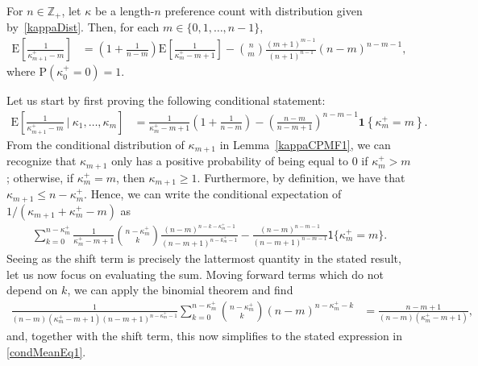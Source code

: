 \documentclass[opre,nonblindrev]{informs3_no_remark}
\newcommand{\E}[1]{{\mathrm{E}\left[#1\right]}}
\newcommand{\PP}[1]{\mathrm{P}\left( #1 \right)}
\begin{document}
\begin{lemma}\label{meanRecur1}
For $n \in \mathbb{Z}_+$, let $\kappa$ be a length-$n$ preference count with distribution given by~\eqref{kappaDist}. Then, for each $m \in \{0, 1, \dots, n - 1\}$,
\begin{align}
\E{\frac{1}{\kappa_{m+1}^+ - m} }
&=
\left(1 + \frac{1}{n-m}\right)\E{\frac{1}{\kappa_m^+ - m + 1}}
-
{n \choose m}\frac{(m+1)^{m-1}}{(n+1)^{n-1}}(n-m)^{n-m-1}
,
\end{align}
where $\PP{\kappa_0^+ = 0} = 1$.
\end{lemma}
 Let us start by first proving the following conditional statement:
\begin{align}
\E{\frac{1}{\kappa_{m+1}^+  - m} ~\bigg|~ \kappa_1, \dots, \kappa_m}
&=
\frac{1}{\kappa_m^+ - m + 1}\left(1 + \frac{1}{n-m}\right)
-
\left(\frac{n-m}{n-m+1}\right)^{n-m-1}\mathbf{1}\left\{ \kappa_m^+ = m\right\}
\label{condMeanEq1}
.
\end{align}
From the conditional distribution of $\kappa_{m+1}$ in Lemma~\ref{kappaCPMF1}, we can recognize that $\kappa_{m+1}$ only has a positive probability of being equal to 0 if $\kappa_m^+ > m$; otherwise, if $\kappa_m^+ = m$, then $\kappa_{m+1} \geq 1$. Furthermore, by definition, we have that $\kappa_{m+1} \leq n - \kappa_m^+$. Hence, we can write the conditional expectation of $1/(\kappa_{m+1} + \kappa_m^+ - m)$ as
\begin{align}
\sum_{k=0}^{n-\kappa_m^+}
\frac{1}{\kappa_m^+ - m + 1}
{n - \kappa_m^+ \choose k}
\frac{\left(n-m\right)^{n-k-\kappa_{m}^+-1}}{(n-m+1)^{n-k_m^+-1}}
\nonumber
-
\frac{\left(n-m\right)^{n-m-1}}{(n-m+1)^{n-m-1}}
\mathsf{1}\{\kappa_m^+ = m\}
.
\end{align}
Seeing as the shift term is precisely the lattermost quantity in the stated result, let us now focus on evaluating the sum. Moving forward terms which do not depend on $k$, we can apply the binomial theorem and find
\begin{align*}
\frac{1}{(n-m)(\kappa_m^+ - m + 1)(n-m+1)^{n-\kappa_m^+-1}}
\sum_{k=0}^{n-\kappa_m^+}
{n - \kappa_m^+ \choose k}
\left(n-m\right)^{n-\kappa_{m}^+-k}
&=
\frac{n-m+1}{(n-m)(\kappa_m^+ - m + 1)}
,
\end{align*}
and, together with the shift term, this now simplifies to the stated expression in \eqref{condMeanEq1}.
\end{document}
